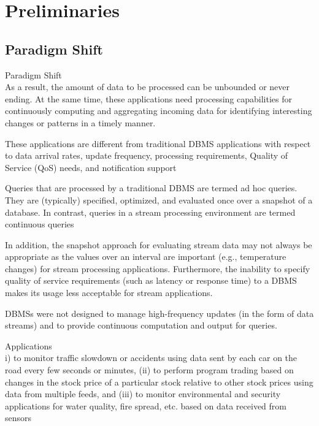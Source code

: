 \chapter{Preliminaries
  \label{chapter:preliminaries}}


\section{Paradigm Shift}
Paradigm Shift\cite{chakravarthy2009stream}\\ As a result, the amount of data to be
processed can be unbounded or never ending. At the same time, these applications
need processing capabilities for continuously computing and aggregating incoming
data for identifying interesting changes or patterns in a timely manner.

These applications are different from traditional DBMS applications with respect
to data arrival rates, update frequency, processing requirements, Quality of
Service (QoS) needs, and notification support

Queries that are processed by a traditional DBMS are termed ad hoc queries. They
are (typically) specified, optimized, and evaluated once over a snapshot of a
database. In contrast, queries in a stream processing environment are termed
continuous queries

In addition, the snapshot approach for evaluating stream data may not always be
appropriate as the values over an interval are important (e.g., temperature
changes) for stream processing applications. Furthermore, the inability to
specify quality of service requirements (such as latency or response time) to a
DBMS makes its usage less acceptable for stream applications.

DBMSs were not designed to manage high-frequency updates (in the form of data
streams) and to provide continuous computation and output for queries.

Applications\cite{chakravarthy2009stream}\\ i) to monitor traffic slowdown or
accidents using data sent by each car on the road every few seconds or minutes,
(ii) to perform program trading based on changes in the stock price of a
particular stock relative to other stock prices using data from multiple feeds,
and (iii) to monitor environmental and security applications for water
quality, fire spread, etc. based on data received from sensors

